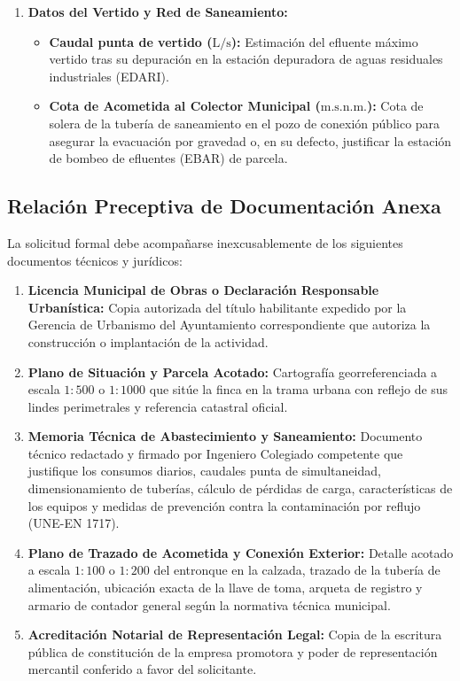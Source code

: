 \documentclass{report}
\begin{document}
\begin{enumerate}
    \item \textbf{Datos del Vertido y Red de Saneamiento:}
          \begin{itemize}
              \item \textbf{Caudal punta de vertido ($\text{L/s}$):} Estimación del efluente máximo vertido tras su depuración en la estación depuradora de aguas residuales industriales (EDARI).
              \item \textbf{Cota de Acometida al Colector Municipal ($\text{m.s.n.m.}$):} Cota de solera de la tubería de saneamiento en el pozo de conexión público para asegurar la evacuación por gravedad o, en su defecto, justificar la estación de bombeo de efluentes (EBAR) de parcela.
          \end{itemize}
\end{enumerate}

\subsection{Relación Preceptiva de Documentación Anexa}

La solicitud formal debe acompañarse inexcusablemente de los siguientes documentos técnicos y jurídicos:
\begin{enumerate}
    \item \textbf{Licencia Municipal de Obras o Declaración Responsable Urbanística:} Copia autorizada del título habilitante expedido por la Gerencia de Urbanismo del Ayuntamiento correspondiente que autoriza la construcción o implantación de la actividad.
    \item \textbf{Plano de Situación y Parcela Acotado:} Cartografía georreferenciada a escala $1:500$ o $1:1000$ que sitúe la finca en la trama urbana con reflejo de sus lindes perimetrales y referencia catastral oficial.
    \item \textbf{Memoria Técnica de Abastecimiento y Saneamiento:} Documento técnico redactado y firmado por Ingeniero Colegiado competente que justifique los consumos diarios, caudales punta de simultaneidad, dimensionamiento de tuberías, cálculo de pérdidas de carga, características de los equipos y medidas de prevención contra la contaminación por reflujo (UNE-EN 1717).
    \item \textbf{Plano de Trazado de Acometida y Conexión Exterior:} Detalle acotado a escala $1:100$ o $1:200$ del entronque en la calzada, trazado de la tubería de alimentación, ubicación exacta de la llave de toma, arqueta de registro y armario de contador general según la normativa técnica municipal.
    \item \textbf{Acreditación Notarial de Representación Legal:} Copia de la escritura pública de constitución de la empresa promotora y poder de representación mercantil conferido a favor del solicitante.
\end{enumerate}
\end{document}
